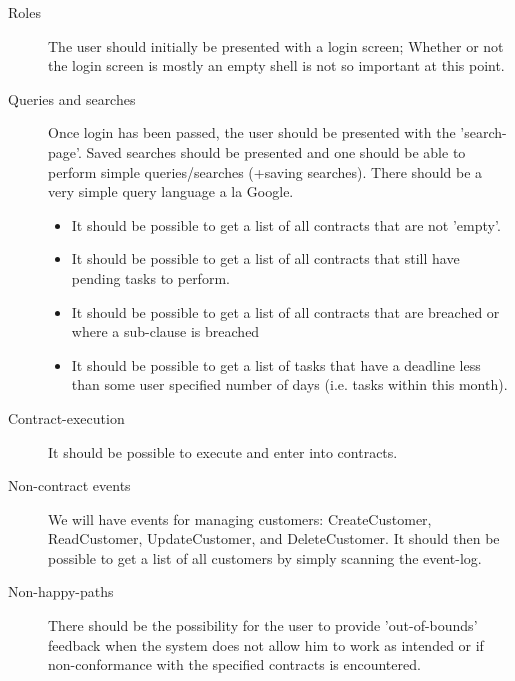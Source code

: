 \documentclass[envcountsame]{llncs}
\begin{document}
\begin{description}
\item[Roles] The user should initially be presented with a login
  screen; Whether or not the login screen is mostly an empty shell is
  not so important at this point.

\item[Queries and searches] Once login has been passed, the user
  should be presented with the 'search-page'. Saved searches should be
  presented and one should be able to perform simple queries/searches
  (+saving searches). There should be a very simple query language a
  la Google.
  \begin{itemize}
  \item It should be possible to get a list of all contracts that are
    not 'empty'.
  \item It should be possible to get a list of all contracts that
    still have pending tasks to perform.
  \item It should be possible to get a list of all contracts that are
    breached or where a sub-clause is breached
  \item It should be possible to get a list of tasks that have a
    deadline less than some user specified number of days (i.e.  tasks
    within this month).
  \end{itemize}

\item[Contract-execution] It should be possible to execute and enter
  into contracts.

\item[Non-contract events] We will have events for managing customers:
  CreateCustomer, ReadCustomer, UpdateCustomer, and DeleteCustomer. It
  should then be possible to get a list of all customers by simply
  scanning the event-log. 
		
\item[Non-happy-paths] There should be the possibility for the user to
  provide 'out-of-bounds' feedback when the system does not allow him
  to work as intended or if non-conformance with the specified
  contracts is encountered.


\end{description}
\end{document}
